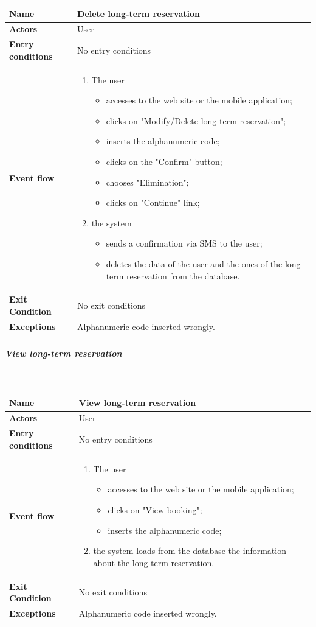 \begin{tabular}{l l}
 \textbf {Name} & Delete long-term reservation  \\ \hline
 \textbf{Actors} & User \\ \hline
 \textbf{Entry conditions} & No entry conditions \\ \hline
 \textbf{Event flow} & 
 \parbox{0.7\textwidth}{
 \begin{enumerate}
 \item The user
 \begin{itemize}
 \item accesses to the web site or the mobile application;
 \item clicks on "Modify/Delete long-term reservation";
 \item inserts the alphanumeric code;
 \item clicks on the "Confirm" button;
 \item chooses "Elimination";
 \item clicks on "Continue" link;
 \end{itemize}
 \item the system
 \begin{itemize}
 \item sends a confirmation via SMS to the user;
 \item deletes the data of the user and the ones of the long-term reservation from the database.
 \end{itemize}
 \end{enumerate}
 } \\ \hline
 \textbf{Exit Condition} & No exit conditions \\ \hline
 \textbf{Exceptions} & Alphanumeric code inserted wrongly.
\end{tabular}
\newpage
\subparagraph{View long-term reservation}
~\\[0.2cm]
\vspace{20pt}
\noindent
\begin{tabular}{l l}
 \textbf {Name} & View long-term reservation  \\ \hline
 \textbf{Actors} & User \\ \hline
 \textbf{Entry conditions} & No entry conditions \\ \hline
 \textbf{Event flow} & 
 \parbox{0.7\textwidth}{
 \begin{enumerate}
 \item The user
 \begin{itemize}
 \item accesses to the web site or the mobile application;
 \item clicks on "View booking";
 \item inserts the alphanumeric code;
 \end{itemize}
 \item the system loads from the database the information about the long-term reservation.
 \end{enumerate}
 } \\ \hline
 \textbf{Exit Condition} & No exit conditions \\ \hline
 \textbf{Exceptions} & Alphanumeric code inserted wrongly.
\end{tabular}
\newpage

